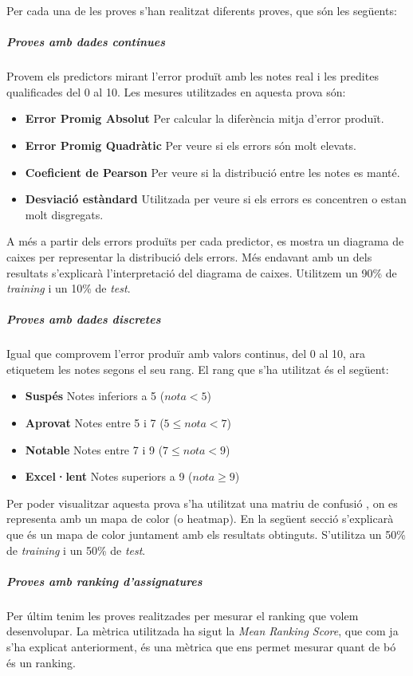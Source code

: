 \documentclass[12pt,a4paper,catalan]{article}
\begin{document}
Per cada una de les proves s'han realitzat diferents proves, que són les següents:

\subparagraph{Proves amb dades continues}
Provem els predictors mirant l'error produït amb les notes real i les predites qualificades del 0 al 10. Les mesures utilitzades en aquesta prova són:

\begin{itemize}[leftmargin=.5in]
	\item \textbf{Error Promig Absolut} Per calcular la diferència mitja d'error produït.
	\item \textbf{Error Promig Quadràtic} Per veure si els errors són molt elevats.
	\item \textbf{Coeficient de Pearson} Per veure si la distribució entre les notes es manté.
	\item \textbf{Desviació estàndard} Utilitzada per veure si els errors es concentren o estan molt disgregats.
\end{itemize}

A més a partir dels errors produïts per cada predictor, es mostra un diagrama de caixes \cite{boxplot} per representar la distribució dels errors. Més endavant amb un dels resultats s'explicarà l'interpretació del diagrama de caixes. Utilitzem un 90\% de \textit{training} i un 10\% de \textit{test}.


\subparagraph{Proves amb dades discretes}
Igual que comprovem l'error produïr amb valors continus, del 0 al 10, ara etiquetem les notes segons el seu rang. El rang que s'ha utilitzat és el següent:

\begin{itemize}[leftmargin=.5in]
	\item \textbf{Suspés} Notes inferiors a 5 ($nota < 5$)
	\item \textbf{Aprovat} Notes entre 5 i 7 ($5 \leq nota < 7 $)
	\item \textbf{Notable} Notes entre 7 i 9 ($7 \leq nota < 9 $)
	\item \textbf{Excel·lent} Notes superiors a 9 ($nota \geq 9$)
\end{itemize}

Per poder visualitzar aquesta prova s'ha utilitzat una matriu de confusió \cite{confusionmatrix}, on es representa amb un mapa de color (o heatmap). En la següent secció s'explicarà que és un mapa de color juntament amb els resultats obtinguts. S'utilitza un 50\% de \textit{training} i un 50\% de \textit{test}.

\subparagraph{Proves amb ranking d'assignatures}
Per últim tenim les proves realitzades per mesurar el ranking que volem desenvolupar. La mètrica utilitzada ha sigut la \textit{Mean Ranking Score}, que com ja s'ha explicat anteriorment, és una mètrica que ens permet mesurar quant de bó és un ranking.
\end{document}
